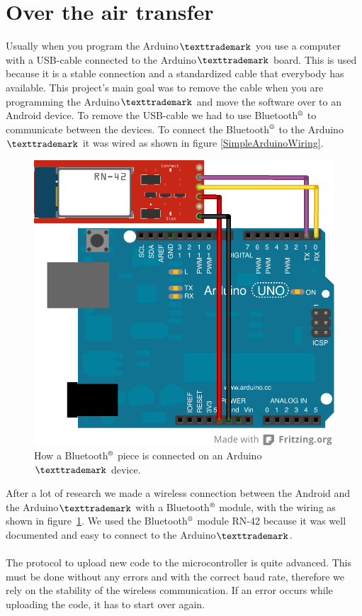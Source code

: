 \section{Over the air transfer}
Usually when you program the Arduino$\texttrademark$ you use a computer with a USB-cable connected to the Arduino$\texttrademark$ board. This is used because it is a stable connection and a standardized cable that everybody has available. This project's main goal was to remove the cable when you are programming the Arduino$\texttrademark$ and move the software over to an Android device. To remove the USB-cable we had to use Bluetooth$\textsuperscript{\textregistered}$ to communicate between the devices. To connect the Bluetooth$\textsuperscript{\textregistered}$ to the Arduino$\texttrademark$ it was wired as shown in figure \ref{SimpleArduinoWiring}.
\\
\begin{figure}[H]
\centering
\includegraphics[scale=1.2]{images/wiring_simple.png}
\caption[Wiring Diagram for BT module]{How a Bluetooth$\textsuperscript{\textregistered}$ piece is connected on an Arduino$\texttrademark$ device.}
\label{fig:SimpleArduinoWiring}
\end{figure}

After a lot of research we made a wireless connection between the Android and the Arduino$\texttrademark$ with a Bluetooth$\textsuperscript{\textregistered}$ module, with the wiring as shown in figure~\ref{fig:SimpleArduinoWiring}. We used the Bluetooth$\textsuperscript{\textregistered}$ module RN-42 because it was well documented and easy to connect to the Arduino$\texttrademark$.\\
\\
The protocol to upload new code to the microcontroller is quite advanced. This must be done without any errors and with the correct baud rate, therefore we rely on the stability of the wireless communication. If an error occurs while uploading the code, it has to start over again.
